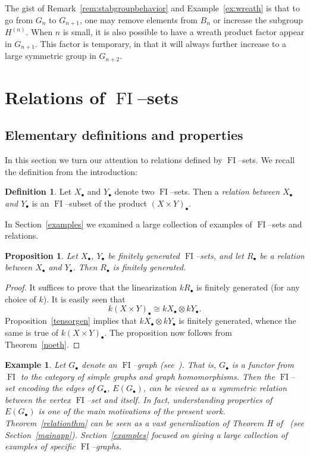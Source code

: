 \documentclass[10pt]{amsart}
\DeclareMathOperator{\FI}{FI}
\newcommand{\dt}{\bullet}
\newtheorem{proposition}[theorem]{Proposition}
\newtheorem{example}[theorem]{Example}
\theoremstyle{definition}
\newtheorem{definition}[theorem]{Definition}
\begin{document}
The gist of Remark~\ref{rem:stabgroupbehavior} and Example~\ref{ex:wreath} is that to go from $G_n$ to $G_{n+1}$, one may remove elements from $B_n$ or increase the subgroup $H^{(n)}$. When $n$ is small, it is also possible to have a wreath product factor appear in $G_{n+1}$. This factor is temporary, in that it will always further increase to a large symmetric group in $G_{n+2}$.

\section{Relations of \texorpdfstring{$\FI$}{FI}--sets}

\subsection{Elementary definitions and properties}

In this section we turn our attention to relations defined by $\FI$--sets. We recall the definition from the introduction:

\begin{definition}
Let $X_\dt$ and $Y_\dt$ denote two $\FI$--sets. Then a \emph{relation between $X_\dt$ and $Y_\dt$} is an $\FI$--subset of the product $(X \times Y)_\dt$. 
\end{definition}

In Section~\ref{examples} we examined a large collection of examples of $\FI$--sets and relations.

\begin{proposition}
Let $X_\dt$, $Y_\dt$ be finitely generated $\FI$--sets, and let $R_\dt$ be a relation between $X_\dt$ and $Y_\dt$. Then $R_\dt$ is finitely generated.
\end{proposition}

\begin{proof}
It suffices to prove that the linearization $k R_\dt$ is finitely generated (for any choice of $k$). It is easily seen that
\[
k(X \times Y)_\dt \cong kX_\dt \otimes kY_\dt.
\]
Proposition~\ref{tensorgen} implies that $kX_\dt \otimes kY_\dt$ is finitely generated, whence the same is true of $k(X\times Y)_\dt$. The proposition now follows from Theorem~\ref{noeth}.
\end{proof}

\begin{example}
Let $G_\dt$ denote an $\FI$--graph (see~\cite{RW}). That is, $G_\dt$ is a functor from $\FI$ to the category of simple graphs and graph homomorphisms. Then the $\FI$--set encoding the edges of $G_\dt$, $E(G_\dt)$, can be viewed as a symmetric relation between the vertex $\FI$--set and itself. In fact, understanding properties of $E(G_\dt)$ is one of the main motivations of the present work. Theorem~\ref{relationthm} can be seen as a vast generalization of Theorem H of~\cite{RW} (see Section~\ref{mainapp}). Section~\ref{examples} focused on giving a large collection of examples of specific $\FI$--graphs.
\end{example}
\end{document}
